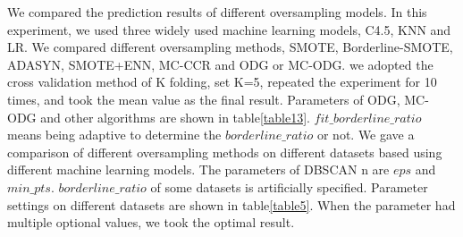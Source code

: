 \documentclass[ida]{iosart2x}
\begin{document}
We compared the prediction results of different oversampling models.
In this experiment, we used three widely used machine learning models, C4.5, KNN and LR.
We compared different oversampling methods, SMOTE, Borderline-SMOTE, ADASYN, SMOTE+ENN, MC-CCR 
and ODG or MC-ODG.
we adopted the cross validation method of K folding, 
set K=5, repeated the experiment for 10 times, 
and took the mean value as the final result.
Parameters of ODG, MC-ODG and other algorithms are shown in table\ref{table13}.
$fit\_borderline\_ratio$ means being 
adaptive to determine the $borderline\_ratio$ or not.
We gave a comparison of different oversampling methods on different 
datasets based using different machine learning models.  
The parameters of DBSCAN n are $eps$ and $min\_pts$.
$borderline\_ratio$ of some datasets is artificially specified.
Parameter settings on different datasets are shown in table\ref{table5}.
When the parameter had multiple optional values, we took the optimal result.
\end{document}
